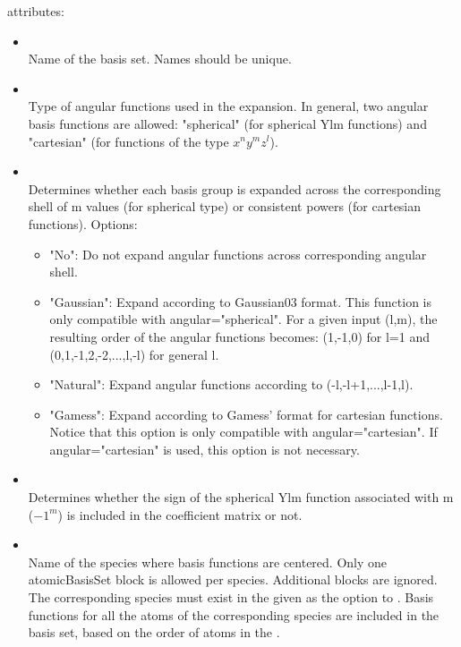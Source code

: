  attributes:

\begin{itemize}
\item {}\\
Name of the basis set. Names should be unique.
\item {}\\
Type of angular functions used in the expansion. In general, two angular basis functions are allowed: "spherical" (for spherical Ylm functions) and "cartesian" (for functions of the type $x^{n}y^{m}z^{l}$).  
\item {}\\
Determines whether each basis group is expanded across the corresponding shell of m values (for spherical type) or consistent powers (for cartesian functions). Options:
\begin{itemize}
\item "No": Do not expand angular functions across corresponding angular shell.
\item "Gaussian": Expand according to Gaussian03 format. This function is only compatible with angular="spherical". For a given input (l,m), the resulting order of the angular functions becomes: (1,-1,0) for l=1 and (0,1,-1,2,-2,...,l,-l) for general l.
\item "Natural": Expand angular functions according to (-l,-l+1,...,l-1,l). 
\item "Gamess": Expand according to Gamess' format for cartesian functions. Notice that this option is only compatible with angular="cartesian". If angular="cartesian" is used, this option is not necessary.
\end{itemize}
\item {}\\ 
Determines whether the sign of the spherical Ylm function associated with m ($-1^{m}$) is included in the coefficient matrix or not.
\item {}\\
Name of the species where basis functions are centered. Only one atomicBasisSet block is allowed per species. Additional blocks are ignored. The corresponding species must exist in the  given as the  option to . Basis functions for all the atoms of the corresponding species are included in the basis set, based on the order of atoms in the .
\end{itemize}

